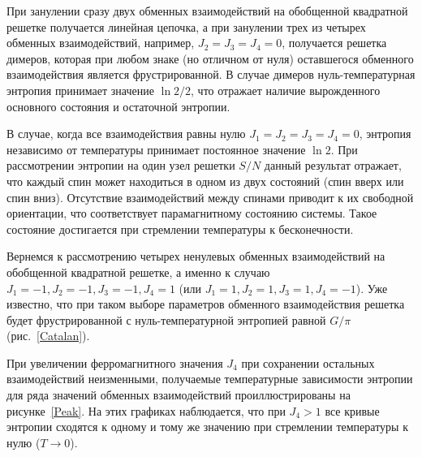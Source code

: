 \documentclass[utf8,12pt]{jetp}
\begin{document}
При занулении сразу двух обменных взаимодействий на обобщенной квадратной решетке получается линейная цепочка, а при занулении трех из четырех обменных взаимодействий, например, $J_2 = J_3 = J_4 = 0$, получается решетка димеров, которая при любом знаке (но отличном от нуля) оставшегося обменного взаимодействия является фрустрированной. В случае димеров нуль-температурная энтропия принимает значение $\ln 2/2$, что отражает наличие вырожденного основного состояния и остаточной энтропии.

В случае, когда все взаимодействия равны нулю $J_1 = J_2 = J_3 = J_4 = 0$, энтропия независимо от температуры принимает постоянное значение $\ln 2$. При рассмотрении энтропии на один узел решетки $S/N$ данный результат отражает, что каждый спин может находиться в одном из двух состояний (спин вверх или спин вниз). Отсутствие взаимодействий между спинами приводит к их свободной ориентации, что соответствует парамагнитному состоянию системы. Такое состояние достигается при стремлении температуры к бесконечности.

Вернемся к рассмотрению четырех ненулевых обменных взаимодействий на обобщенной квадратной решетке, а именно к случаю $J_1 = -1, J_2 = -1, J_3 = -1, J_4 = 1$ (или $J_1 = 1, J_2 = 1, J_3 = 1, J_4 = -1$). Уже известно, что при таком выборе параметров обменного взаимодействия решетка будет фрустрированной с нуль-температурной энтропией равной $G/\pi$ (рис.~\ref{Catalan}). 

При увеличении ферромагнитного значения $J_4$ при сохранении остальных взаимодействий неизменными, получаемые температурные зависимости энтропии для ряда значений обменных взаимодействий проиллюстрированы на рисунке~\ref{Peak}. На этих графиках наблюдается, что при $J_4>1$ все кривые энтропии сходятся к одному и тому же значению при стремлении температуры к нулю ($T \rightarrow 0$). 
\end{document}
